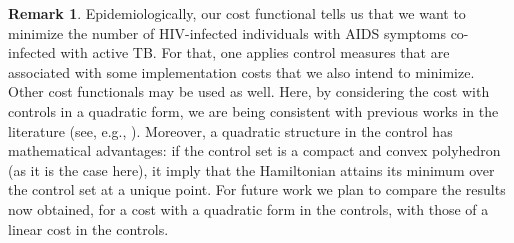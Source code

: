 \documentclass{my_aims}
\theoremstyle{definition}
\newtheorem{remark}{Remark}
\begin{document}
\begin{remark}
Epidemiologically, our cost functional tells us that we want to minimize the number
of HIV-infected individuals with AIDS symptoms co-infected with active TB.
For that, one applies control measures that are associated with some implementation
costs that we also intend to minimize. Other cost functionals may be used as well.
Here, by considering the cost with controls in a quadratic form,
we are being consistent with previous works in the literature
(see, e.g., \cite{MR3266821,Silva:Torres:TBOC:MBS:2013}).
Moreover, a quadratic structure in the control has
mathematical advantages: if the control set is a compact and convex polyhedron (as
it is the case here), it imply that the Hamiltonian attains its minimum over
the control set at a unique point. For future work we plan
to compare the results now obtained, for a cost with a quadratic
form in the controls, with those of a linear cost in the controls.
\end{remark}
\end{document}

